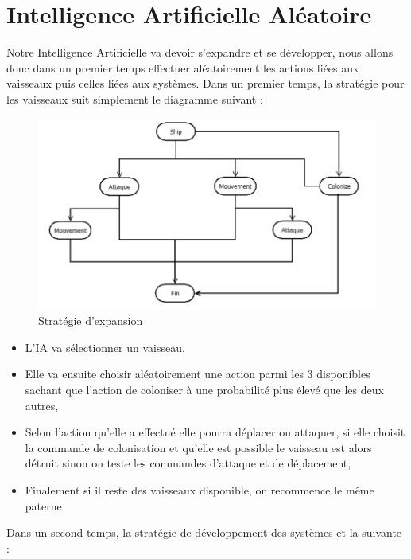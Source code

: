 \section{Intelligence Artificielle Aléatoire}

Notre Intelligence Artificielle va devoir s'expandre et se développer, nous allons donc dans un premier temps effectuer aléatoirement les actions liées aux vaisseaux puis celles liées aux systèmes.
Dans un premier temps, la stratégie pour les vaisseaux suit simplement le diagramme suivant :

\begin{figure}[!h]
\centering
\includegraphics[width=1\textwidth]{pics/IA_random.PNG}
\caption[Stratégie d'expansion]{\label{figure_simple}Stratégie d'expansion}
\end{figure}



\begin{itemize}
\item L'IA va sélectionner un vaisseau,
\item Elle va ensuite choisir aléatoirement une action parmi les 3 disponibles sachant que l'action de coloniser à une probabilité plus élevé que les deux autres,
\item Selon l'action qu'elle a effectué elle pourra déplacer ou attaquer, si elle choisit la commande de colonisation et qu'elle est possible le vaisseau est alors détruit sinon on teste les commandes d'attaque et de déplacement,
\item Finalement si il reste des vaisseaux disponible, on recommence le même paterne 
\end{itemize}

Dans un second temps, la stratégie de développement des systèmes et la suivante : 

